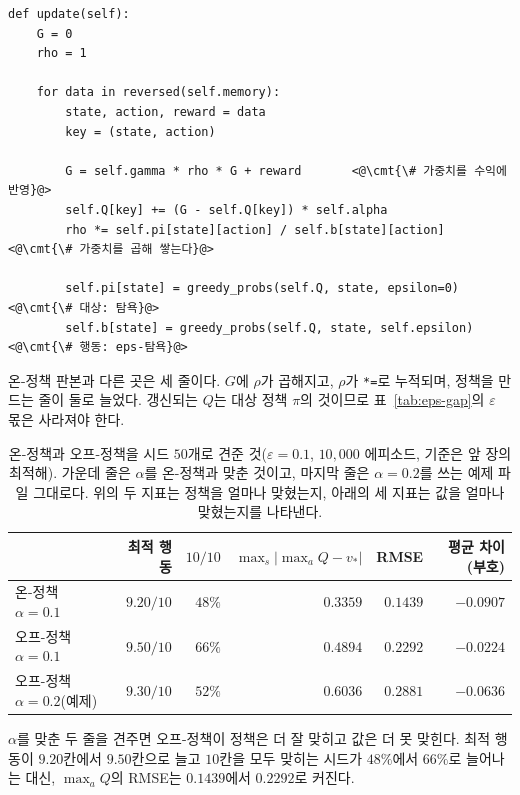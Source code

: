 \documentclass[11pt,a4paper]{article}
\newcommand{\cmt}[1]{\textcolor{codecm}{#1}}   %
\begin{document}
\begin{lstlisting}[caption={오프-정책 MC 제어 (\texttt{s05\_mc\_control\_offpolicy.py}),
$\varepsilon=0.1$, $\alpha=0.2$},label={lst:mc-off}]
def update(self):
    G = 0
    rho = 1

    for data in reversed(self.memory):
        state, action, reward = data
        key = (state, action)

        G = self.gamma * rho * G + reward       <@\cmt{\# 가중치를 수익에 반영}@>
        self.Q[key] += (G - self.Q[key]) * self.alpha
        rho *= self.pi[state][action] / self.b[state][action]  <@\cmt{\# 가중치를 곱해 쌓는다}@>

        self.pi[state] = greedy_probs(self.Q, state, epsilon=0)     <@\cmt{\# 대상: 탐욕}@>
        self.b[state] = greedy_probs(self.Q, state, self.epsilon)   <@\cmt{\# 행동: eps-탐욕}@>
\end{lstlisting}

온-정책 판본과 다른 곳은 세 줄이다. $G$에 $\rho$가 곱해지고, $\rho$가 \lstinline|*=|로 누적되며,
정책을 만드는 줄이 둘로 늘었다. 갱신되는 $Q$는 대상 정책 $\pi$의 것이므로 표~\ref{tab:eps-gap}의
$\varepsilon$ 몫은 사라져야 한다.

\begin{table}[htbp]
\centering
\caption{온-정책과 오프-정책을 시드 $50$개로 견준 것($\varepsilon=0.1$, $10{,}000$ 에피소드,
기준은 앞 장의 최적해). 가운데 줄은 $\alpha$를 온-정책과 맞춘 것이고, 마지막 줄은
$\alpha=0.2$를 쓰는 예제 파일 그대로다. 위의 두 지표는 정책을 얼마나 맞혔는지, 아래의 세 지표는
값을 얼마나 맞혔는지를 나타낸다.}
\label{tab:on-vs-off}
\small
\begin{tabular}{@{}lrrrrr@{}}
\toprule
 & 최적 행동 & $10/10$ & $\max_s|\max_a Q - v_*|$ & RMSE & 평균 차이(부호) \\
\midrule
온-정책 \ \ $\alpha=0.1$   & $9.20/10$ & $48\%$ & $0.3359$ & $0.1439$ & $-0.0907$ \\
오프-정책 $\alpha=0.1$     & $9.50/10$ & $66\%$ & $0.4894$ & $0.2292$ & $-0.0224$ \\
오프-정책 $\alpha=0.2$(예제) & $9.30/10$ & $52\%$ & $0.6036$ & $0.2881$ & $-0.0636$ \\
\bottomrule
\end{tabular}
\end{table}

$\alpha$를 맞춘 두 줄을 견주면 오프-정책이 정책은 더 잘 맞히고 값은 더 못 맞힌다. 최적 행동이
$9.20$칸에서 $9.50$칸으로 늘고 $10$칸을 모두 맞히는 시드가 $48\%$에서 $66\%$로 늘어나는 대신,
$\max_a Q$의 RMSE는 $0.1439$에서 $0.2292$로 커진다.
\end{document}
